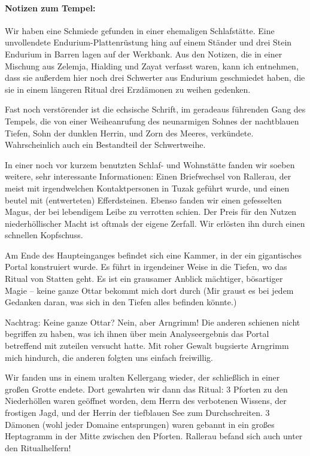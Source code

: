 \paragraph{Notizen zum Tempel:}
Wir haben eine Schmiede gefunden in einer ehemaligen Schlafstätte. Eine unvollendete Endurium-Plattenrüstung hing auf einem Ständer und drei Stein Endurium in Barren lagen auf der Werkbank. Aus den Notizen, die in einer Mischung aus Zelemja, Hialding und Zayat verfasst waren, kann ich entnehmen, dass sie außerdem hier noch drei Schwerter aus Endurium geschmiedet haben, die sie in einem längeren Ritual drei Erzdämonen zu weihen gedenken.

Fast noch verstörender ist die echsische Schrift, im geradeaus führenden Gang des Tempels, die von einer Weiheanrufung des neunarmigen Sohnes der nachtblauen Tiefen, Sohn der dunklen Herrin, und Zorn des Meeres, verkündete. Wahrscheinlich auch ein Bestandteil der Schwertweihe.

In einer noch vor kurzem benutzten Schlaf- und Wohnstätte fanden wir soeben weitere, sehr interessante Informationen:
Einen Briefwechsel von Rallerau, der meist mit irgendwelchen Kontaktpersonen in Tuzak geführt wurde, und einen beutel mit (entwerteten) Efferdsteinen.
Ebenso fanden wir einen gefesselten Magus, der bei lebendigem Leibe zu verrotten schien. Der Preis für den Nutzen niederhöllischer Macht ist oftmals der eigene Zerfall.
 Wir erlösten ihn durch einen schnellen Kopfschuss.

Am Ende des Haupteinganges befindet sich eine Kammer, in der ein gigantisches Portal konstruiert wurde. Es führt in irgendeiner Weise in die Tiefen, wo das Ritual von Statten geht. Es ist ein grausamer Anblick mächtiger, bösartiger Magie -- keine ganze Ottar bekommt mich dort durch (Mir graust es bei jedem Gedanken daran, was sich in den Tiefen alles befinden könnte.)

Nachtrag: Keine ganze Ottar? Nein, aber Arngrimm! Die anderen schienen nicht begriffen zu haben, was ich ihnen über mein Analyseergebnis das Portal betreffend mit zuteilen versucht hatte. Mit roher Gewalt bugsierte Arngrimm mich hindurch, die anderen folgten uns einfach freiwillig.

Wir fanden uns in einem uralten Kellergang wieder, der schließlich in einer großen Grotte endete. Dort gewahrten wir dann das Ritual:
3 Pforten zu den Niederhöllen waren geöffnet worden, dem Herrn des verbotenen Wissens, der frostigen Jagd, und der Herrin der tiefblauen See zum Durchschreiten. 3 Dämonen (wohl jeder Domaine entsprungen) waren gebannt in ein großes Heptagramm in der Mitte zwischen den Pforten.
Rallerau befand sich auch unter den Ritualhelfern!

